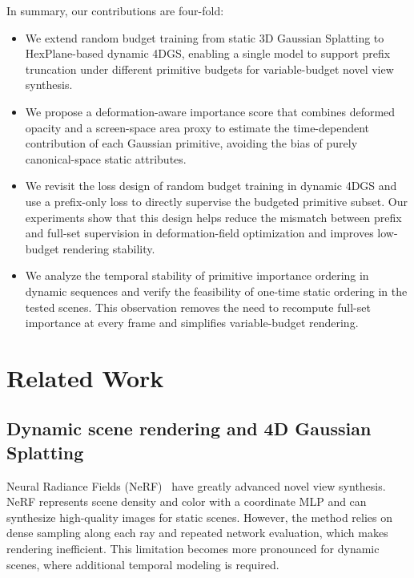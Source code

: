 \documentclass[pdflatex,sn-mathphys]{sn-jnl}
\begin{document}
In summary, our contributions are four-fold:

\begin{itemize}
    \item We extend random budget training from static 3D Gaussian Splatting to HexPlane-based dynamic 4DGS, enabling a single model to support prefix truncation under different primitive budgets for variable-budget novel view synthesis.
    \item We propose a deformation-aware importance score that combines deformed opacity and a screen-space area proxy to estimate the time-dependent contribution of each Gaussian primitive, avoiding the bias of purely canonical-space static attributes.
    \item We revisit the loss design of random budget training in dynamic 4DGS and use a prefix-only loss to directly supervise the budgeted primitive subset. Our experiments show that this design helps reduce the mismatch between prefix and full-set supervision in deformation-field optimization and improves low-budget rendering stability.
    \item We analyze the temporal stability of primitive importance ordering in dynamic sequences and verify the feasibility of one-time static ordering in the tested scenes. This observation removes the need to recompute full-set importance at every frame and simplifies variable-budget rendering.
\end{itemize}

\section{Related Work}
\label{sec:related}

\subsection{Dynamic scene rendering and 4D Gaussian Splatting}

Neural Radiance Fields (NeRF)~\cite{mildenhall2020nerf} have greatly advanced novel view synthesis. NeRF represents scene density and color with a coordinate MLP and can synthesize high-quality images for static scenes. However, the method relies on dense sampling along each ray and repeated network evaluation, which makes rendering inefficient. This limitation becomes more pronounced for dynamic scenes, where additional temporal modeling is required.
\end{document}
